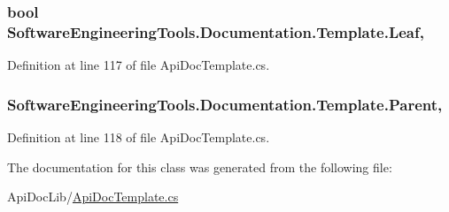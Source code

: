 \hypertarget{class_software_engineering_tools_1_1_documentation_1_1_template_a7f9bc50ec9f9639c32308d3905ba92a1}{
\subsubsection[{Leaf}]{\setlength{\rightskip}{0pt plus 5cm}bool Software\+Engineering\+Tools.\+Documentation.\+Template.\+Leaf\hspace{0.3cm}{\ttfamily [get]}, {\ttfamily [set]}}}\label{class_software_engineering_tools_1_1_documentation_1_1_template_a7f9bc50ec9f9639c32308d3905ba92a1}


Definition at line 117 of file Api\+Doc\+Template.\+cs.

\hypertarget{class_software_engineering_tools_1_1_documentation_1_1_template_a66d27db7b9ae8045f5cfad58c6818f39}{
\subsubsection[{Parent}]{ Software\+Engineering\+Tools.\+Documentation.\+Template.\+Parent\hspace{0.3cm}{\ttfamily [get]}, {\ttfamily [set]}}}\label{class_software_engineering_tools_1_1_documentation_1_1_template_a66d27db7b9ae8045f5cfad58c6818f39}


Definition at line 118 of file Api\+Doc\+Template.\+cs.



The documentation for this class was generated from the following file\+:\begin{DoxyCompactItemize}
\item 
Api\+Doc\+Lib/\hyperlink{_api_doc_template_8cs}{Api\+Doc\+Template.\+cs}\end{DoxyCompactItemize}
